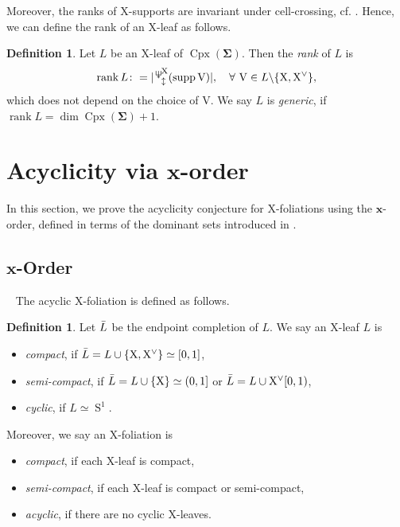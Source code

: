 \documentclass[11pt,reqno]{amsart}
\newcommand{\Neptune}{\mathord{\text{\tikz[baseline=-.5ex,scale=.13]{\draw[line width=.45pt] (0,0)--(0,1.8) (-.6,1.8)--(-.6,.8)--(.6,.8)--(.6,1.8) (-.35,.35)--(.35,.35);}}}}
\theoremstyle{plain}
\theoremstyle{definition}
\newtheorem{definition}[theorem]{Definition}
\numberwithin{equation}{section}
\newcommand\<{\langle}
\renewcommand\>{\rangle}
\newcommand{\rank}{\operatorname{rank}}
\newcommand{\on}[1]{\operatorname{#1}}
\def\CCx{\on{Cpx}}   %
\def\sphere{\on{S}}   %
\def\sink{X}
\newcommand{\ccpt}[1]{\mathrm{#1}}%
\def\xevo{\ccpt{X}}%
\def\seeds{\mathbf{\Sigma}}
\def\xx{\mathbf{x}}%
\def\supp{\on{supp}}
\newcommand{\suppdu}[1]{\operatorname{\Neptune}_{\updownarrow}^{#1}}
\newcommand{\DT}[1]{#1^{\vee}}
\def\Xevo{\DT{\ccpt{X}}}
\begin{document}
Moreover, the ranks of $\xevo$-supports are invariant under cell-crossing, cf. .
Hence, we can define the rank of an $\xevo$-leaf as follows.

\begin{definition}\label{def:rankL}
Let $L$ be an $\xevo$-leaf of $\CCx(\seeds)$. Then the \emph{rank} of $L$ is
\begin{gather}
    \rank L\colon=|\suppdu{\xevo}(\supp\ccpt{V})|,\quad\forall~\ccpt{V}\in L\backslash\{\xevo,\Xevo\},
\end{gather}
which does not depend on the choice of $\ccpt{V}$. We say $L$ is \emph{generic}, if $\rank L=\dim\CCx(\seeds)+1$.
\end{definition}





\section{\texorpdfstring{Acyclicity via $\xx$-order}{Acyclicity via x-order}}\label{sec:acyclic}

In this section,
we prove the acyclicity conjecture  for $\xevo$-foliations using the $\xx$-order, defined in terms of the dominant sets introduced in \cite{Cao}.

\subsection{${\xx}$-Order}\label{sec:xorder}\
The acyclic $\xevo$-foliation is defined as follows.

\begin{definition}
Let $\Bar{L}$ be the endpoint completion of $L$.
We say an $\xevo$-leaf $L$ is
\begin{itemize}
    \item \emph{compact}, if $\Bar{L}=L\cup\{\xevo,\Xevo\}\simeq[0,1]$,
    \item \emph{semi-compact}, if $\Bar{L}=L\cup\{\xevo\}\simeq(0,1]$ or $\Bar{L}=L\cup{\Xevo}[0,1)$,
    \item \emph{cyclic}, if $L\simeq\sphere^1$.
\end{itemize}
Moreover, we say an $\xevo$-foliation is
\begin{itemize}
    \item \emph{compact}, if each $\xevo$-leaf is compact,
    \item \emph{semi-compact}, if each $\xevo$-leaf is compact or semi-compact,
    \item \emph{acyclic}, if there are no cyclic $\xevo$-leaves.
\end{itemize}
\end{definition}
\end{document}
